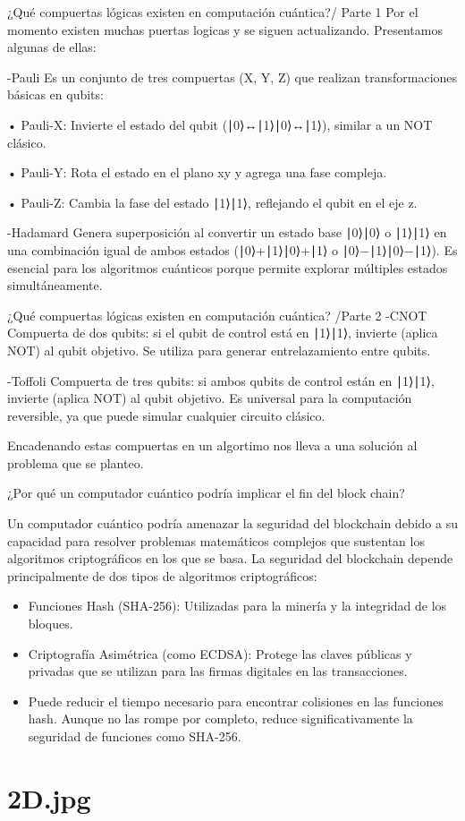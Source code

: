 \documentclass[presentation]{beamer}
\begin{document}
\begin{frame}[label={sec:org94c21ab}]{¿Qué compuertas lógicas existen en computación cuántica?/ Parte 1}
Por el momento existen muchas puertas logicas y se siguen actualizando.
Presentamos algunas de ellas:

-\alert{Pauli}
 Es un conjunto de tres compuertas (X, Y, Z) que realizan transformaciones básicas en qubits:

• Pauli-X: Invierte el estado del qubit (∣0⟩↔∣1⟩∣0⟩↔∣1⟩), similar a un NOT clásico.

• Pauli-Y: Rota el estado en el plano xy y agrega una fase compleja.

• Pauli-Z: Cambia la fase del estado ∣1⟩∣1⟩, reflejando el qubit en el eje z.

-\alert{Hadamard}
Genera superposición al convertir un estado base ∣0⟩∣0⟩ o ∣1⟩∣1⟩ en una combinación igual de ambos estados (∣0⟩+∣1⟩∣0⟩+∣1⟩ o ∣0⟩−∣1⟩∣0⟩−∣1⟩).
Es esencial para los algoritmos cuánticos porque permite explorar múltiples estados simultáneamente.
\end{frame}

\begin{frame}[label={sec:org6c0696f}]{¿Qué compuertas lógicas existen en computación cuántica? /Parte 2}
-\alert{CNOT}
Compuerta de dos qubits: si el qubit de control está en ∣1⟩∣1⟩, invierte (aplica NOT) al qubit objetivo.
Se utiliza para generar entrelazamiento entre qubits.

-\alert{Toffoli}
Compuerta de tres qubits: si ambos qubits de control están en ∣1⟩∣1⟩, invierte (aplica NOT) al qubit objetivo.
Es universal para la computación reversible, ya que puede simular cualquier circuito clásico.

Encadenando estas compuertas en un algortimo nos lleva a una solución al problema que se planteo.
\end{frame}

\begin{frame}[label={sec:orgcd1c637}]{¿Por qué un computador cuántico podría implicar el fin del block chain?}


Un computador cuántico podría amenazar la seguridad del blockchain debido a su capacidad para resolver problemas
matemáticos complejos que sustentan los algoritmos criptográficos en los que se basa.
La seguridad del blockchain depende principalmente de dos tipos de algoritmos criptográficos:
\begin{itemize}
\item Funciones Hash (SHA-256): Utilizadas para la minería y la integridad de los bloques.
\item Criptografía Asimétrica (como ECDSA): Protege las claves públicas y privadas que se utilizan para las firmas digitales en las transacciones.
\item Puede reducir el tiempo necesario para encontrar colisiones en las funciones hash. Aunque no las rompe por completo, reduce significativamente
la seguridad de funciones como SHA-256.
\end{itemize}
\end{frame}

\section{2D.jpg}
\label{sec:orgdde7571}
\end{document}
